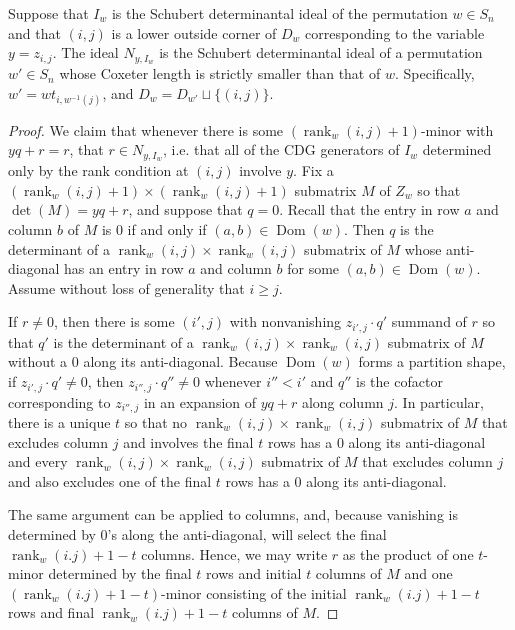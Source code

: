 \documentclass[ALCO,Unicode,published]{cedram}
\DeclareMathOperator{\rank}{rank}
\DeclareMathOperator{\Dom}{Dom}
\begin{document}
\begin{lemma}\label{lem:SchubertDel}
Suppose that $I_w$ is the Schubert determinantal ideal of the permutation $w \in S_n$ and that $(i,j)$ is a lower outside corner of $D_w$ corresponding to the variable $y = z_{i,j}$.  The ideal $N_{y,I_w}$ is the Schubert determinantal ideal of a permutation $w' \in S_n$ whose Coxeter length is strictly smaller than that of $w$.  Specifically, $w' = wt_{i,w^{-1}(j)}$, and $D_w = D_{w'} \sqcup \{(i,j)\}$.  
\end{lemma}
\begin{proof}
We claim that whenever there is some $(\rank_w(i,j)+1)$-minor with $yq+r = r$, that $r \in N_{y,I_w}$, i.e. that all of the CDG generators of $I_w$ determined only by the rank condition at $(i,j)$ involve $y$.  Fix a $(\rank_w(i,j)+1) \times (\rank_w(i,j)+1)$ submatrix $M$ of $Z_w$ so that $\det(M) = yq+r$, and suppose that $q = 0$.  Recall that the entry in row $a$ and column $b$ of $M$ is $0$ if and only if $(a,b) \in \Dom(w)$.  Then $q$ is the determinant of a $\rank_w(i,j) \times \rank_w(i,j)$ submatrix of $M$ whose anti-diagonal has an entry in row $a$ and column $b$ for some $(a,b) \in \Dom(w)$.  Assume without loss of generality that $i \geq j$.  

If $r \neq 0$, then there is some $(i',j)$ with nonvanishing $z_{i',j} \cdot q'$  summand of $r$ so that $q'$ is the determinant of a $\rank_w(i,j) \times \rank_w(i,j)$ submatrix of $M$ without a $0$ along its anti-diagonal.  Because $\Dom(w)$ forms a partition shape, if $z_{i',j}\cdot q' \neq 0$, then $z_{i'',j} \cdot q'' \neq 0$ whenever $i''<i'$ and $q''$ is the cofactor corresponding to $z_{i'',j}$ in an expansion of $yq+r$ along column $j$.  In particular, there is a unique $t$ so that no $\rank_w(i,j) \times \rank_w(i,j)$ submatrix of $M$ that excludes column $j$ and involves the final $t$ rows has a $0$ along its anti-diagonal and every $\rank_w(i,j) \times \rank_w(i,j)$ submatrix of $M$ that excludes column $j$ and also excludes one of the final $t$ rows has a $0$ along its anti-diagonal.  

The same argument can be applied to columns, and, because vanishing is determined by $0$'s along the anti-diagonal, will select the final $\rank_w(i.j)+1-t$ columns.  Hence, we may write  $r$ as the product of one $t$-minor determined by the final $t$ rows and initial $t$ columns of $M$ and one $(\rank_w(i.j)+1-t)$-minor consisting of the initial $\rank_w(i.j)+1-t$ rows and final $\rank_w(i.j)+1-t$ columns of $M$.  


\end{proof}
\end{document}
